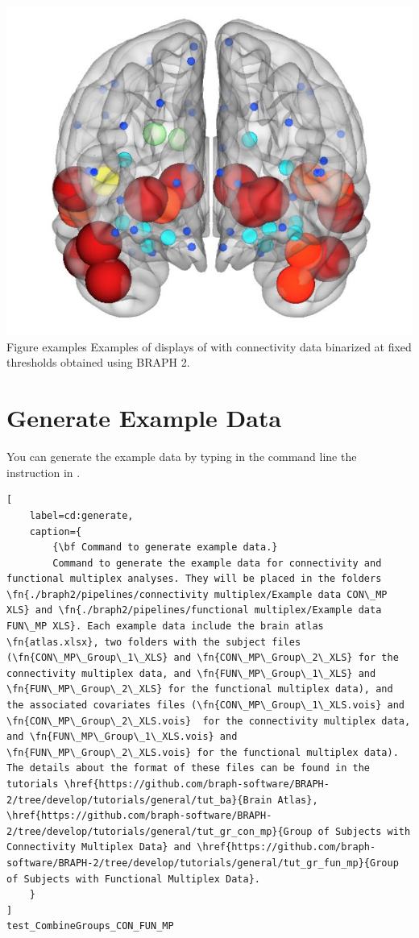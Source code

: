 \documentclass[justified]{tufte-handout}
\begin{document}
{	\includegraphics{fig01_03.jpg}
	}
	{Figure examples}
	{
	Examples of displays of  with connectivity data binarized at fixed thresholds obtained using BRAPH 2.
	}
	
\tableofcontents

\clearpage
\section{Generate Example Data}

You can generate the example data by typing in the command line the instruction in .
%
\begin{lstlisting}[
	label=cd:generate,
	caption={
		{\bf Command to generate example data.}
		Command to generate the example data for connectivity and functional multiplex analyses. They will be placed in the folders \fn{./braph2/pipelines/connectivity multiplex/Example data CON\_MP XLS} and \fn{./braph2/pipelines/functional multiplex/Example data FUN\_MP XLS}. Each example data include the brain atlas \fn{atlas.xlsx}, two folders with the subject files (\fn{CON\_MP\_Group\_1\_XLS} and \fn{CON\_MP\_Group\_2\_XLS} for the connectivity multiplex data, and \fn{FUN\_MP\_Group\_1\_XLS} and \fn{FUN\_MP\_Group\_2\_XLS} for the functional multiplex data), and the associated covariates files (\fn{CON\_MP\_Group\_1\_XLS.vois} and \fn{CON\_MP\_Group\_2\_XLS.vois}  for the connectivity multiplex data, and \fn{FUN\_MP\_Group\_1\_XLS.vois} and \fn{FUN\_MP\_Group\_2\_XLS.vois} for the functional multiplex data). The details about the format of these files can be found in the tutorials \href{https://github.com/braph-software/BRAPH-2/tree/develop/tutorials/general/tut_ba}{Brain Atlas}, \href{https://github.com/braph-software/BRAPH-2/tree/develop/tutorials/general/tut_gr_con_mp}{Group of Subjects with Connectivity Multiplex Data} and \href{https://github.com/braph-software/BRAPH-2/tree/develop/tutorials/general/tut_gr_fun_mp}{Group of Subjects with Functional Multiplex Data}.
	}
]
test_CombineGroups_CON_FUN_MP
\end{lstlisting}
\end{document}
